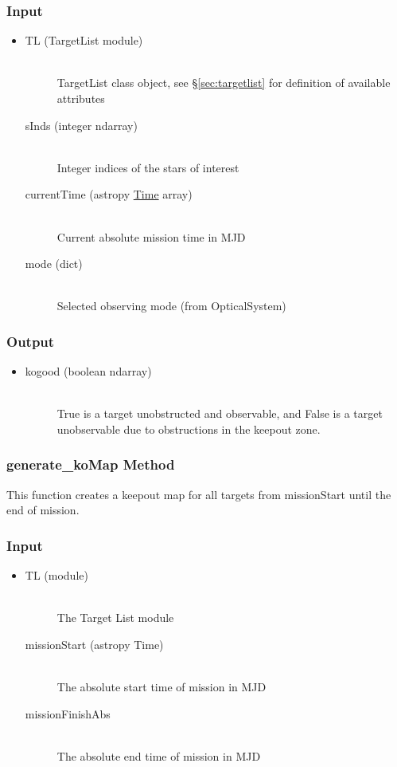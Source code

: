 \documentclass[cleanfoot]{asme2ej}
\begin{document}
\subsubsection*{Input}
\begin{itemize}
\item
\begin{description}
    \item[TL (TargetList module)] \hfill \\ TargetList class object, see \S\ref{sec:targetlist} for definition of available attributes
    \item[sInds (integer ndarray)] \hfill \\ Integer indices of the stars of interest
    \item[currentTime (astropy \href{http://astropy.readthedocs.org/en/latest/time/index.html}{Time} array)] \hfill \\ Current absolute mission time in MJD
    \item[mode (dict)] \hfill \\ Selected observing mode (from OpticalSystem)
\end{description}
\end{itemize}
\subsubsection*{Output}
\begin{itemize}
\item 
\begin{description}
    \item[kogood (boolean ndarray)] \hfill \\ True is a target unobstructed and observable, and False is a target unobservable due to obstructions in the keepout zone.
\end{description}
\end{itemize}

\subsubsection{generate\_koMap Method} \label{sec:generatekoMaptask}
This function creates a keepout map for all targets from missionStart until the end of mission.
\subsubsection*{Input}
\begin{itemize}
\item 
\begin{description}
    \item[TL (module)] \hfill \\ The Target List module
    \item[missionStart (astropy Time)] \hfill \\ The absolute start time of mission in MJD
    \item[missionFinishAbs] \hfill \\ The absolute end time of mission in MJD
\end{description}
\end{itemize}
\end{document}
